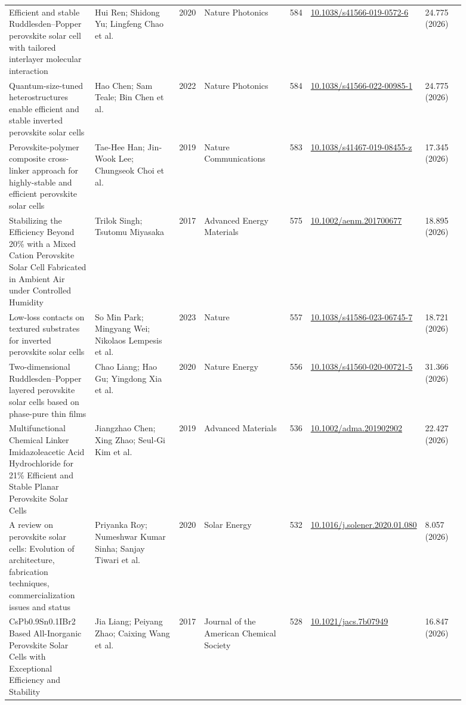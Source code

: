 \documentclass[10pt,a4paper]{article}
\begin{document}
{\begin{longtable}{p{0.197\linewidth}p{0.197\linewidth}p{0.043\linewidth}p{0.197\linewidth}p{0.043\linewidth}p{0.117\linewidth}p{0.098\linewidth}}
Efficient and stable Ruddlesden–Popper perovskite solar cell with tailored interlayer molecular interaction & Hui Ren; Shidong Yu; Lingfeng Chao et al. & 2020 & Nature Photonics & 584 & \href{https://doi.org/10.1038/s41566-019-0572-6}{10.1038/s41566-019-0572-6} & 24.775 (2026) \\
Quantum-size-tuned heterostructures enable efficient and stable inverted perovskite solar cells & Hao Chen; Sam Teale; Bin Chen et al. & 2022 & Nature Photonics & 584 & \href{https://doi.org/10.1038/s41566-022-00985-1}{10.1038/s41566-022-00985-1} & 24.775 (2026) \\
Perovskite-polymer composite cross-linker approach for highly-stable and efficient perovskite solar cells & Tae-Hee Han; Jin‐Wook Lee; Chungseok Choi et al. & 2019 & Nature Communications & 583 & \href{https://doi.org/10.1038/s41467-019-08455-z}{10.1038/s41467-019-08455-z} & 17.345 (2026) \\
Stabilizing the Efficiency Beyond 20\% with a Mixed Cation Perovskite Solar Cell Fabricated in Ambient Air under Controlled Humidity & Trilok Singh; Tsutomu Miyasaka & 2017 & Advanced Energy Materials & 575 & \href{https://doi.org/10.1002/aenm.201700677}{10.1002/aenm.201700677} & 18.895 (2026) \\
Low-loss contacts on textured substrates for inverted perovskite solar cells & So Min Park; Mingyang Wei; Nikolaos Lempesis et al. & 2023 & Nature & 557 & \href{https://doi.org/10.1038/s41586-023-06745-7}{10.1038/s41586-023-06745-7} & 18.721 (2026) \\
Two-dimensional Ruddlesden–Popper layered perovskite solar cells based on phase-pure thin films & Chao Liang; Hao Gu; Yingdong Xia et al. & 2020 & Nature Energy & 556 & \href{https://doi.org/10.1038/s41560-020-00721-5}{10.1038/s41560-020-00721-5} & 31.366 (2026) \\
Multifunctional Chemical Linker Imidazoleacetic Acid Hydrochloride for 21\% Efficient and Stable Planar Perovskite Solar Cells & Jiangzhao Chen; Xing Zhao; Seul‐Gi Kim et al. & 2019 & Advanced Materials & 536 & \href{https://doi.org/10.1002/adma.201902902}{10.1002/adma.201902902} & 22.427 (2026) \\
A review on perovskite solar cells: Evolution of architecture, fabrication techniques, commercialization issues and status & Priyanka Roy; Numeshwar Kumar Sinha; Sanjay Tiwari et al. & 2020 & Solar Energy & 532 & \href{https://doi.org/10.1016/j.solener.2020.01.080}{10.1016/j.solener.2020.01.080} & 8.057 (2026) \\
CsPb0.9Sn0.1IBr2 Based All-Inorganic Perovskite Solar Cells with Exceptional Efficiency and Stability & Jia Liang; Peiyang Zhao; Caixing Wang et al. & 2017 & Journal of the American Chemical Society & 528 & \href{https://doi.org/10.1021/jacs.7b07949}{10.1021/jacs.7b07949} & 16.847 (2026) \\

\end{longtable}}
\end{document}
